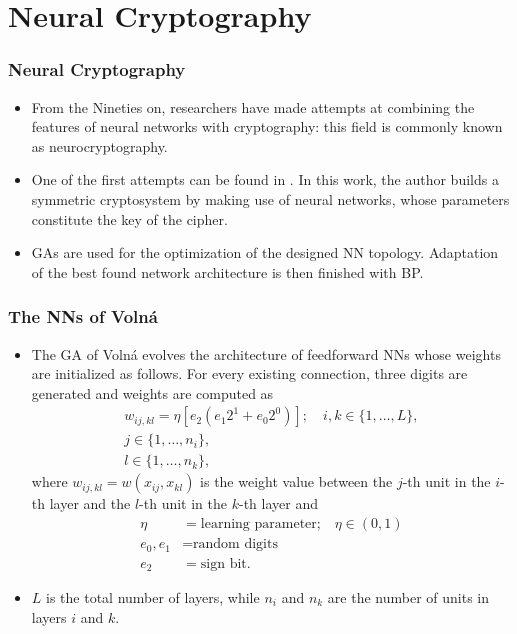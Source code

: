 \documentclass{beamer}
\begin{document}
\section{Neural Cryptography}
\begin{frame} %
\frametitle{Neural Cryptography}
\begin{itemize}
\item From the Nineties on, researchers have made attempts at combining the features of neural networks with cryptography: this field is commonly known as neurocryptography.
\item One of the first attempts can be found in \cite{volna}. In this work, the author builds a symmetric cryptosystem by making use of neural networks, whose parameters constitute the key of the cipher.
\item GAs are used for the optimization of the designed NN topology. Adaptation of the best found network architecture is then finished with BP.
\end{itemize}
\end{frame}
\begin{frame}
\frametitle{The NNs of Volná}
\begin{itemize}
\item The GA of Volná evolves the architecture of feedforward NNs whose weights are initialized as follows. For every existing connection, three digits are generated and weights are computed as 
\begin{align*}
w_{ij,kl} = \eta[e_2(e_1 2^1 + e_0 2^0)]; \quad i,k\in\{1,\dots,L\}, \\
  j\in\{1,\dots, n_i\}, \\
  l \in\{1, \dots, n_k\},
\end{align*}
where $w_{ij,kl} = w(x_{ij}, x_{kl})$ is the weight value between the $j$-th unit in the $i$-th layer and the $l$-th unit in the $k$-th layer and
\begin{align*}
    \eta &= \text{learning parameter;} \quad \eta \in (0,1)\\
    e_0, e_1 &= \text{random digits} \\
  	e_2 &= \text{sign bit}.
\end{align*}
\item $L$ is the total number of layers, while $n_i$ and $n_k$ are the number of units in layers $i$ and $k$.
\end{itemize}
\end{frame}
\end{document}
